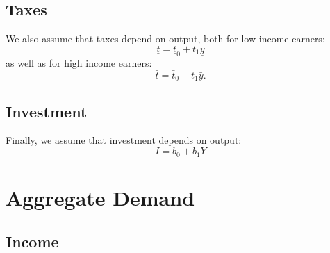 \documentclass[]{book}
\theoremstyle{definition}
\theoremstyle{definition}
\theoremstyle{definition}
\theoremstyle{remark}
\begin{document}
\subsection{Taxes}\label{taxes}

We also assume that taxes depend on output, both for low income earners:
\[\underline{t}=\underline{t}_{0}+t_1\underline{y}\] as well as for high
income earners: \[\bar{t}=\bar{t}_{0}+t_1\bar{y}.\]

\subsection{Investment}\label{investment}

Finally, we assume that investment depends on output: \[I=b_{0}+b_{1}Y\]

\section{Aggregate Demand}\label{aggregate-demand}

\subsection{Income}\label{income}
\end{document}
